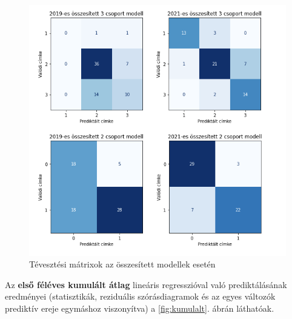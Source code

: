 \documentclass[12pt]{article}
\begin{document}
\begin{figure}[H]
\centering
\includegraphics[width=.8\textwidth]{kepek/confusion_matrices.png}
\caption{Tévesztési mátrixok az összesített modellek esetén}
\label{fig:confusion}
\end{figure}

\newpage

Az \textbf{első féléves kumulált átlag} lineáris regresszióval való prediktálásának eredményei (statisztikák, reziduális szórásdiagramok és az egyes változók prediktív ereje egymáshoz viszonyítva) a \ref{fig:kumulalt}. ábrán láthatóak. 

\vspace{0.5cm}
\end{document}

